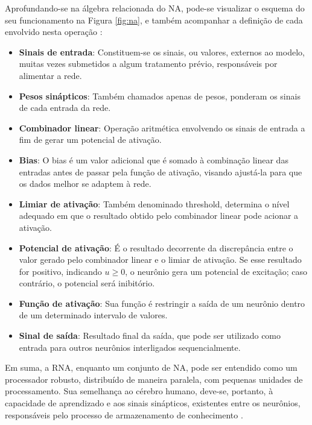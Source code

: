 Aprofundando-se na álgebra relacionada do NA, pode-se visualizar o esquema do seu funcionamento na Figura \ref{fig:na}, e também acompanhar a definição de cada envolvido nesta operação \cite{deeplearningbook2023}:

\begin{itemize}
    \item \textbf{Sinais de entrada}: Constituem-se os sinais, ou valores, externos ao modelo, muitas vezes submetidos a algum tratamento prévio, responsáveis por alimentar a rede.
    \item \textbf{Pesos sinápticos}: Também chamados apenas de pesos, ponderam os sinais de cada entrada da rede.
    \item \textbf{Combinador linear}: Operação aritmética envolvendo os sinais de entrada a fim de gerar um potencial de ativação.
    \item \textbf{Bias}: O bias é um valor adicional que é somado à combinação linear das entradas antes de passar pela função de ativação, visando ajustá-la para que os dados melhor se adaptem à rede.
    \item \textbf{Limiar de ativação}: Também denominado threshold, determina o nível adequado em que o resultado obtido pelo combinador linear pode acionar a ativação.
    \item \textbf{Potencial de ativação}: É o resultado decorrente da discrepância entre o valor gerado pelo combinador linear e o limiar de ativação. Se esse resultado for positivo, indicando \(u \geq 0\), o neurônio gera um potencial de excitação; caso contrário, o potencial será inibitório.
    \item \textbf{Função de ativação}: Sua função é restringir a saída de um neurônio dentro de um determinado intervalo de valores.
    \item \textbf{Sinal de saída}: Resultado final da saída, que pode ser utilizado como entrada para outros neurônios interligados sequencialmente.
  \end{itemize}  

  Em suma, a RNA, enquanto um conjunto de NA, pode ser entendido como um processador robusto, distribuído de maneira paralela, com pequenas unidades de processamento. Sua semelhança ao cérebro humano, deve-se, portanto, à capacidade de aprendizado e aos sinais sinápticos, existentes entre os neurônios, responsáveis pelo processo de armazenamento de conhecimento \cite{haykin2001redes}.
	
